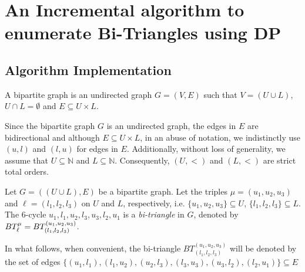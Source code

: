\chapter{An Incremental algorithm to enumerate Bi-Triangles using DP}
\section{Algorithm Implementation}

\begin{definition} 
A bipartite graph is an undirected graph $G=(V,E)$  such that $V=(U\cup L)$, $U\cap L=\emptyset$ and $E\subseteq U\times L$.\cite{Bondy1976}
\end{definition}

Since the bipartite graph $G$ is an undirected graph, the edges in $E$ are bidirectional and although $E\subseteq U\times L$, in an abuse of notation, we indistinctly use $(u,l)$ and $(l,u)$ for edges in $E$. Additionally, 
without loss of generality, we assume that  $U\subseteq \mathbb{N}$ and $L\subseteq \mathbb{N}$. Consequently, $(U,<)$  and $(L,<)$ are strict total orders. 

%
\begin{definition}[Bi-Triangle]
Let $G=((U\cup L),E)$ be a bipartite graph. Let the triples $\mu=(u_1, u_2, u_3)$ and $\ell=(l_1, l_2,l_3)$ on $U$ and $L$, respectively, i.e.  $\{u_1, u_2, u_3\} \subseteq U$, $\{l_1, l_2,l_3\} \subseteq L$. 
The 6-cycle $u_1,l_1,u_2,l_3,u_3,l_2,u_1$  is a \textit{bi-triangle} in $G$, denoted by $BT_{\ell}^{\mu} = BT_{(l_1, l_2,l_3)}^{(u_1, u_2, u_3)}$. 
\end{definition}

In what follows, when convenient, the bi-triangle $BT_{(l_1,l_2,l_3)}^{(u_1,u_2,u_3)}$  will be denoted by the set of edges $\{(u_1, l_1), (l_1,u_2), (u_2, l_3), (l_3,u_3), (u_3, l_2), (l_2,u_1)\} \subseteq E$


